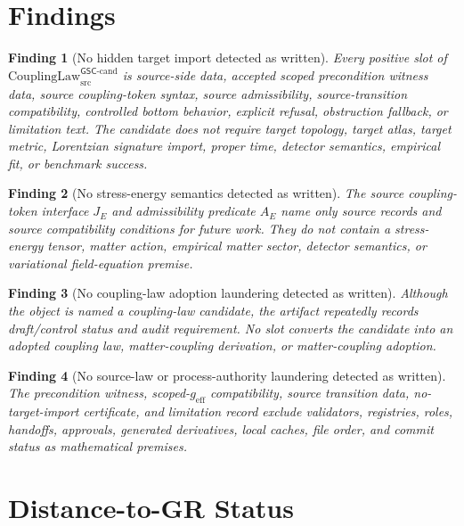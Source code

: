 \documentclass[11pt]{article}
\newcommand{\geff}{g_{\mathrm{eff}}}
\newcommand{\CouplingLaw}{\mathrm{CouplingLaw}^{\mathsf{GSC}\mbox{-}\mathrm{cand}}_{\mathrm{src}}}
\newtheorem{finding}{Finding}
\begin{document}
\section{Findings}

\begin{finding}[No hidden target import detected as written]
Every positive slot of \(\CouplingLaw\) is source-side data, accepted scoped
precondition witness data, source coupling-token syntax, source admissibility,
source-transition compatibility, controlled bottom behavior, explicit refusal,
obstruction fallback, or limitation text. The candidate does not require
target topology, target atlas, target metric, Lorentzian signature import,
proper time, detector semantics, empirical fit, or benchmark success.
\end{finding}

\begin{finding}[No stress-energy semantics detected as written]
The source coupling-token interface \(J_E\) and admissibility predicate
\(A_E\) name only source records and source compatibility conditions for
future work. They do not contain a stress-energy tensor, matter action,
empirical matter sector, detector semantics, or variational field-equation
premise.
\end{finding}

\begin{finding}[No coupling-law adoption laundering detected as written]
Although the object is named a coupling-law candidate, the artifact repeatedly
records draft/control status and audit requirement. No slot converts the
candidate into an adopted coupling law, matter-coupling derivation, or
matter-coupling adoption.
\end{finding}

\begin{finding}[No source-law or process-authority laundering detected as written]
The precondition witness, scoped-\(\geff\) compatibility, source transition
data, no-target-import certificate, and limitation record exclude validators,
registries, roles, handoffs, approvals, generated derivatives, local caches,
file order, and commit status as mathematical premises.
\end{finding}

\section{Distance-to-GR Status}
\end{document}
